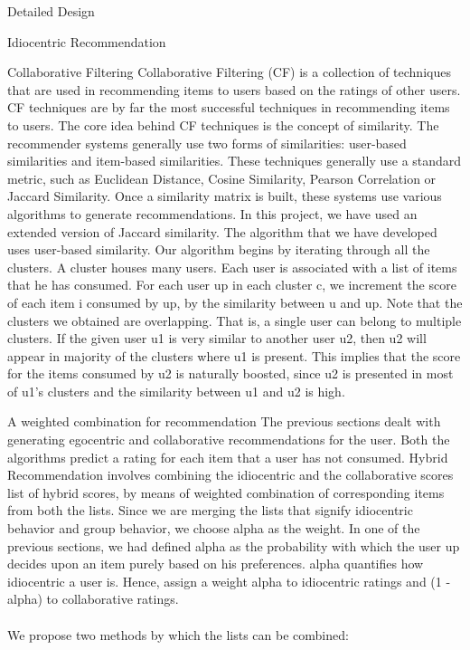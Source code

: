 \documentclass{report}
\begin{document}
\begin{projChapter}{Detailed Design}
\begin{projSection}{Idiocentric Recommendation}
        \end{projSection}
\begin{projSection}{Collaborative Filtering}
            Collaborative Filtering (CF) is a collection of techniques that are used in recommending items to users based on the ratings of other users. CF techniques are by far the most successful techniques in recommending items to users. The core idea behind CF techniques is the concept of similarity. The recommender systems generally use two forms of similarities: user-based similarities and item-based similarities. These techniques generally use a standard metric, such as Euclidean Distance, Cosine Similarity, Pearson Correlation or Jaccard Similarity. Once a similarity matrix is built, these systems use various algorithms to generate recommendations. In this project, we have used an extended version of Jaccard similarity. The algorithm that we have developed uses user-based similarity. Our algorithm begins by iterating through all the clusters. A cluster houses many users. Each user is associated with a list of items that he has consumed. For each user up in each cluster c, we increment the score of each item i consumed by up, by the similarity between u and up. Note that the clusters we obtained are overlapping. That is, a single user can belong to multiple clusters. If the given user u1 is very similar to another user u2, then u2 will appear in majority of the clusters where u1 is present. This implies that the score for the items consumed by u2 is naturally boosted, since u2 is presented in most of u1's clusters and the similarity between u1 and u2 is high.
        \end{projSection}
\begin{projSection}{A weighted combination for recommendation}
            The previous sections dealt with generating egocentric and collaborative recommendations for the user. Both the algorithms predict a rating for each item that a user has not consumed. Hybrid Recommendation involves combining the idiocentric and the collaborative scores list of hybrid scores, by means of weighted combination of corresponding items from both the lists. Since we are merging the lists that signify idiocentric behavior and group behavior, we choose alpha as the weight. In one of the previous sections, we had defined alpha as the probability with which the user up decides upon an item purely based on his preferences. alpha quantifies how idiocentric a user is. Hence, assign a weight alpha to idiocentric ratings and (1 - alpha) to collaborative ratings.
            ~\\\\
            We propose two methods by which the lists can be combined:
            

\end{projSection}
\end{projChapter}
\end{document}
